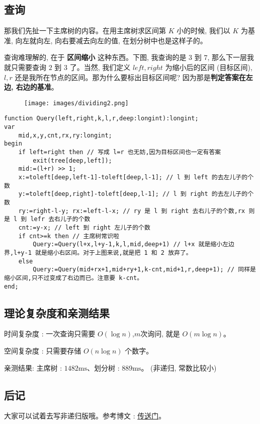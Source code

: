 \subsection{查询}

那我们先扯一下主席树的内容。在用主席树求区间第 $K$ 小的时候, 我们以 $K$ 为基准, 向左就向左, 向右要减去向左的值, 在划分树中也是这样子的。

查询难理解的, 在于 \textbf{区间缩小} 这种东西。下图, 我查询的是 $3$ 到 $7$, 那么下一层我就只需要查询 $2$ 到 $3$ 了。当然, 我们定义 $left,right$ 为缩小后的区间 (目标区间), $l,r$ 还是我所在节点的区间。那为什么要标出目标区间呢? 因为那是\textbf{判定答案在左边, 右边的基准}。

 \begin{figure}[h]
\centering
\texttt{[image: images/dividing2.png]} 

\end{figure}

\begin{verbatim}
function Query(left,right,k,l,r,deep:longint):longint;
var
	mid,x,y,cnt,rx,ry:longint;
begin
	if left=right then // 写成 l=r 也无妨,因为目标区间也一定有答案
		exit(tree[deep,left]);
	mid:=(l+r) >> 1;
	x:=toleft[deep,left-1]-toleft[deep,l-1]; // l 到 left 的去左儿子的个数
	y:=toleft[deep,right]-toleft[deep,l-1]; // l 到 right 的去左儿子的个数
	ry:=right-l-y; rx:=left-l-x; // ry 是 l 到 right 去右儿子的个数,rx 则是 l 到 lefr 去右儿子的个数
	cnt:=y-x; // left 到 right 左儿子的个数
	if cnt>=k then // 主席树常识啦
		Query:=Query(l+x,l+y-1,k,l,mid,deep+1) // l+x 就是缩小左边界,l+y-1 就是缩小右区间。对于上图来说,就是把 1 和 2 放弃了。
	else
		Query:=Query(mid+rx+1,mid+ry+1,k-cnt,mid+1,r,deep+1); // 同样是缩小区间,只不过变成了右边而已。注意要 k-cnt。
end;
\end{verbatim}

\subsection{理论复杂度和亲测结果}

时间复杂度 : 一次查询只需要 $O(\log n)$,$m$次询问, 就是 $O(m\log n)$。

空间复杂度 : 只需要存储 $O(n\log n)$ 个数字。

亲测结果:  主席树 : $1482 \text{ms}$、划分树 : $889 \text{ms}$。 (非递归, 常数比较小)

\subsection{后记}

大家可以试着去写非递归版哦。参考博文 : \href{https://blog.csdn.net/littlewhite520/article/details/70250722}{传送门}。
